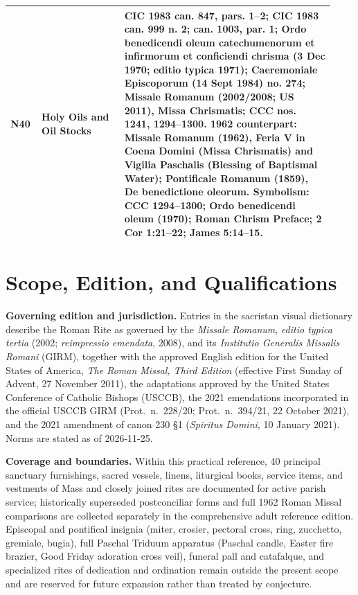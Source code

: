 {\begin{longtable}{>{\raggedright\arraybackslash}p{0.08\linewidth}>{\raggedright\arraybackslash}p{0.24\linewidth}>{\raggedright\arraybackslash}p{0.61\linewidth}}
\textbf{N40} & \textbf{Holy Oils and Oil Stocks} & CIC 1983 can. 847, pars. 1--2; CIC 1983 can. 999 n. 2; can. 1003, par. 1; Ordo benedicendi oleum catechumenorum et infirmorum et conficiendi chrisma (3 Dec 1970; editio typica 1971); Caeremoniale Episcoporum (14 Sept 1984) no. 274; Missale Romanum (2002/2008; US 2011), Missa Chrismatis; CCC nos. 1241, 1294--1300. 1962 counterpart: Missale Romanum (1962), Feria V in Coena Domini (Missa Chrismatis) and Vigilia Paschalis (Blessing of Baptismal Water); Pontificale Romanum (1859), De benedictione oleorum. Symbolism: CCC 1294--1300; Ordo benedicendi oleum (1970); Roman Chrism Preface; 2 Cor 1:21--22; James 5:14--15. \\
\bottomrule
\end{longtable}}

\clearpage
\section{Scope, Edition, and Qualifications}
\textbf{Governing edition and jurisdiction.} Entries in the sacristan visual dictionary describe the Roman Rite as governed by the \textit{Missale Romanum}, \textit{editio typica tertia} (2002; \textit{reimpressio emendata}, 2008), and its \textit{Institutio Generalis Missalis Romani} (GIRM), together with the approved English edition for the United States of America, \textit{The Roman Missal, Third Edition} (effective First Sunday of Advent, 27 November 2011), the adaptations approved by the United States Conference of Catholic Bishops (USCCB), the 2021 emendations incorporated in the official USCCB GIRM (Prot.~n.~228/20; Prot.~n.~394/21, 22 October 2021), and the 2021 amendment of canon 230 \S1 (\textit{Spiritus Domini}, 10 January 2021). Norms are stated as of 2026-11-25.

\textbf{Coverage and boundaries.} Within this practical reference, 40 principal sanctuary furnishings, sacred vessels, linens, liturgical books, service items, and vestments of Mass and closely joined rites are documented for active parish service; historically superseded postconciliar forms and full 1962 Roman Missal comparisons are collected separately in the comprehensive adult reference edition. Episcopal and pontifical insignia (miter, crosier, pectoral cross, ring, zucchetto, gremiale, bugia), full Paschal Triduum apparatus (Paschal candle, Easter fire brazier, Good Friday adoration cross veil), funeral pall and catafalque, and specialized rites of dedication and ordination remain outside the present scope and are reserved for future expansion rather than treated by conjecture.


